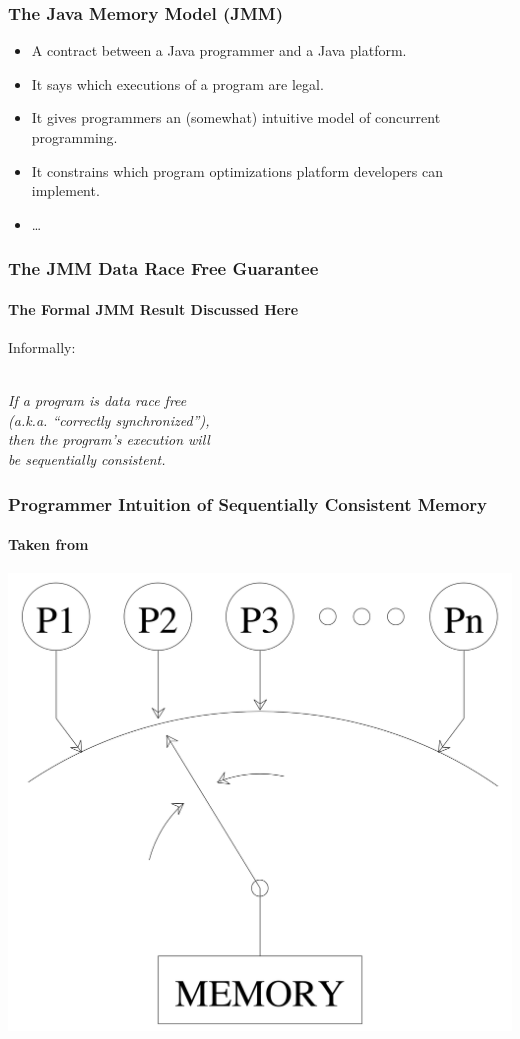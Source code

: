 \begin{frame}
    \frametitle{The Java Memory Model (JMM)}
    \begin{itemize}
        \item A contract between a Java programmer and a Java platform.
        \item It says which executions of a program are legal.
        \item It gives programmers an (somewhat) intuitive model of concurrent
              programming.
        \item It constrains which program optimizations platform developers can
              implement.
        \item \dots
    \end{itemize}
\end{frame}

\begin{frame}
    \frametitle{The JMM Data Race Free Guarantee}
    \framesubtitle{The Formal JMM Result Discussed Here}
    Informally:
    \\~\\
    \begin{center}
        \Large
        \textit{If a program is data race free\\
        (a.k.a. ``correctly synchronized''),\\
        then the program's execution will\\
        be sequentially consistent.}
    \end{center}
\end{frame}

\begin{frame}
    \frametitle{Programmer Intuition of Sequentially Consistent Memory}
    \framesubtitle{Taken from \cite{adve1993designing}}
    \centering
    \includegraphics[width=\textwidth,height=0.85\textheight,keepaspectratio]{adve1995designing-figure_1_1.png}
\end{frame}

